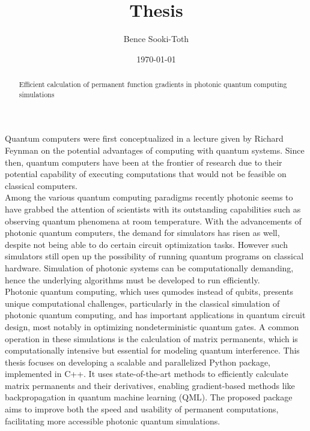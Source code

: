 \documentclass[a4paper]{article}
\title{Thesis}
\author{Bence Sooki-Toth}
\date{\today}
\theoremstyle{definition}
\begin{document}
\maketitle

\begin{abstract}
  \centering
  Efficient calculation of permanent function gradients in photonic quantum computing
  simulations
\end{abstract}

Quantum computers were first conceptualized in a lecture given by Richard Feynman on the potential advantages of computing with quantum systems. Since then, quantum computers have been at the frontier of research due to their potential capability of executing computations that would not be feasible on classical computers. \\

Among the various quantum computing paradigms recently photonic seems to have grabbed the attention of scientists with its outstanding capabilities such as observing quantum phenomena at room temperature. With the advancements of photonic quantum computers, the demand for simulators has risen as well, despite not being able to do certain circuit optimization tasks. However such simulators still open up the possibility of running quantum programs on classical hardware. Simulation of photonic systems can be computationally demanding, hence the underlying algorithms must be developed to run efficiently. \\

Photonic quantum computing, which uses qumodes instead of qubits, presents unique computational challenges, particularly in the classical simulation of photonic quantum computing, and has important applications in quantum circuit design, most notably in optimizing nondeterministic quantum gates. A common operation in these simulations is the calculation of matrix permanents, which is computationally intensive but essential for modeling quantum interference. This thesis focuses on developing a scalable and parallelized Python package, implemented in C++. It uses state-of-the-art methods to efficiently calculate matrix permanents and their derivatives, enabling gradient-based methods like backpropagation in quantum machine learning (QML). The proposed package aims to improve both the speed and usability of permanent computations, facilitating more accessible photonic quantum simulations. \\

\pagebreak
\end{document}
